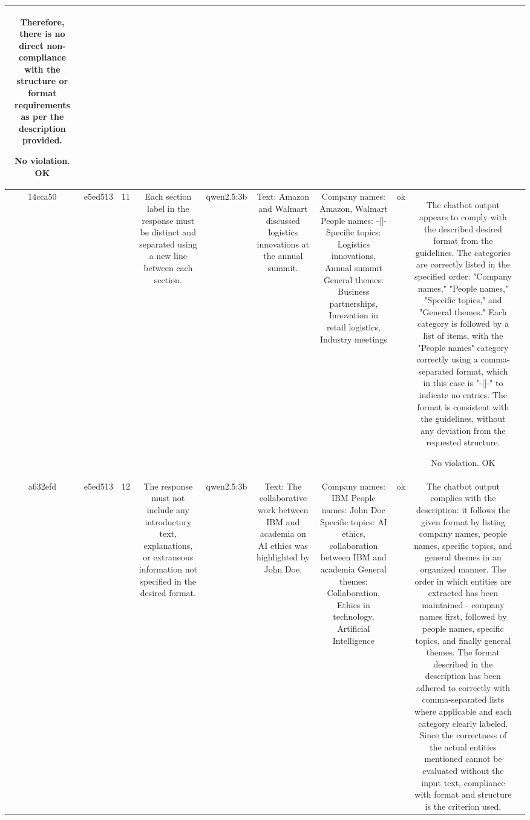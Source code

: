\begin{table}[h!]
\begin{tabular}{|c|c|c|c|c|c|c|c|c|c|}
Therefore, there is no direct non-compliance with the structure or format requirements as per the description provided.

No violation.
OK & \\
\hline
14cca50 & e5ed513 & 11 & Each section label in the response must be distinct and separated using a new line between each section. & qwen2.5:3b & Text: Amazon and Walmart discussed logistics innovations at the annual summit. & Company names: Amazon, Walmart
People names: -||-
Specific topics: Logistics innovations, Annual summit
General themes: Business partnerships, Innovation in retail logistics, Industry meetings & ok & The chatbot output appears to comply with the described desired format from the guidelines. The categories are correctly listed in the specified order: "Company names," "People names," "Specific topics," and "General themes." Each category is followed by a list of items, with the "People names" category correctly using a comma-separated format, which in this case is "-||-" to indicate no entries. The format is consistent with the guidelines, without any deviation from the requested structure.

No violation.
OK & \\
\hline
a632efd & e5ed513 & 12 & The response must not include any introductory text, explanations, or extraneous information not specified in the desired format. & qwen2.5:3b & Text: The collaborative work between IBM and academia on AI ethics was highlighted by John Doe. & Company names: IBM
People names: John Doe
Specific topics: AI ethics, collaboration between IBM and academia
General themes: Collaboration, Ethics in technology, Artificial Intelligence & ok & The chatbot output complies with the description: it follows the given format by listing company names, people names, specific topics, and general themes in an organized manner. The order in which entities are extracted has been maintained - company names first, followed by people names, specific topics, and finally general themes. The format described in the description has been adhered to correctly with comma-separated lists where applicable and each category clearly labeled. Since the correctness of the actual entities mentioned cannot be evaluated without the input text, compliance with format and structure is the criterion used.


\end{tabular}
\end{table}

